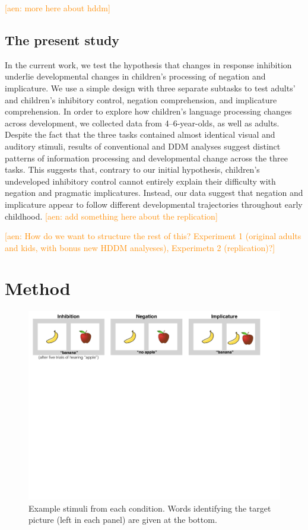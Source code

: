 \documentclass[man, noapacite]{apa2}
\newcommand{\aen}[1]{\textcolor{DarkOrange}{[aen: #1]}}
\begin{document}
\aen{more here about hddm}

\subsection{The present study}

In the current work, we test the hypothesis that changes in response inhibition underlie developmental changes in children's processing of negation and implicature. We use a simple design with three separate subtasks to test adults' and children's inhibitory control, negation comprehension, and implicature comprehension. In order to explore how children's language processing changes across development, we collected data from 4--6-year-olds, as well as adults. Despite the fact that the three tasks contained almost identical visual and auditory stimuli, results of conventional and DDM analyses suggest distinct patterns of information processing and developmental change across the three tasks. This suggests that, contrary to our initial hypothesis, children's undeveloped inhibitory control cannot entirely explain their difficulty with negation and pragmatic implicatures. Instead, our data suggest that negation and implicature appear to follow different developmental trajectories throughout early childhood.
\aen{add something here about the replication}

\aen{How do we want to structure the rest of this?  Experiment 1 (original adults and kids, with bonus new HDDM analyeses), Experimetn 2 (replication)?}


\section{Method}

\begin{figure}[t!]
\begin{centering}
\includegraphics[width=\textwidth]{figures/stimuli.pdf}
\caption{\label{fig:stimuli} Example stimuli from each condition. Words identifying the target picture (left in each panel) are given at the bottom.}
\end{centering}
\end{figure}
\end{document}
